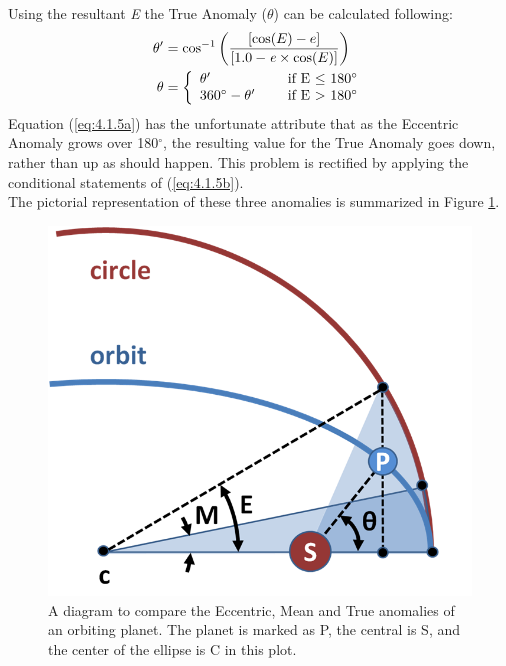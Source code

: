 \documentclass[12pt,preprint]{aastex}
\begin{document}
Using the resultant {\it E} the True Anomaly ($\theta$) can be calculated following:
\begin{subequations}
\begin{align}
\label{eq:4.1.5a}
\theta^{\prime}& = \cos^{-1} \bigg( \frac{[\cos(E) - e]}{[1.0 -{\it e}\times \cos(E)]} \bigg)\\
\label{eq:4.1.5b}
\theta& = \left\{ \begin{array}{l l} \theta^{\prime}& \quad \text{ if E $\leq$ 180$^{\circ}$}\\ 360^{\circ}  - \theta^{\prime}& \quad \text{ if E $>$ 180$^{\circ}$} \end{array}\right.
\end{align}
\end{subequations}
Equation (\ref{eq:4.1.5a}) has the unfortunate attribute that as the Eccentric Anomaly grows over 180$^{\circ}$, the resulting value for the True Anomaly goes down, rather than up as should happen.  This problem is rectified by applying the conditional statements of (\ref{eq:4.1.5b}).\\  

The pictorial representation of these three anomalies is summarized in Figure \ref{fig:Anomalies}.

\begin{figure}[ht]
\begin{center}
\includegraphics[scale=0.4]{Anomalies-MOD.png}
\caption[Diagram of Anomalies]{A diagram to compare the Eccentric, Mean and True anomalies of an orbiting planet.  The planet is marked as P, the central is S, and the center of the ellipse is C in this plot. }
\label{fig:Anomalies}
\end{center}
\end{figure}
\end{document}
